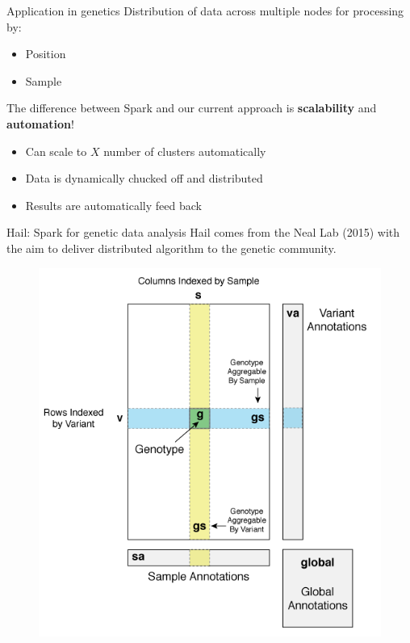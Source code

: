 \documentclass{beamer}
\begin{document}
\begin{frame}{Application in genetics}
  Distribution of data across multiple nodes for processing by:
  \begin{itemize}
    \item Position 
    \item Sample 
  \end{itemize}
  The difference between Spark and our current approach is \textbf{scalability} and \textbf{automation}!
  \begin{itemize}
    \item Can scale to $X$ number of clusters automatically
    \item Data is dynamically chucked off and distributed
    \item Results are automatically feed back
  \end{itemize}
\end{frame}

\begin{frame}{Hail: Spark for genetic data analysis}
  Hail comes from the Neal Lab (2015) with the aim to deliver distributed algorithm to the genetic community.
  \begin{figure}
    \includegraphics[scale=0.33]{figure/hail-vds-rep.png}
  \end{figure}
\end{frame}
\end{document}
